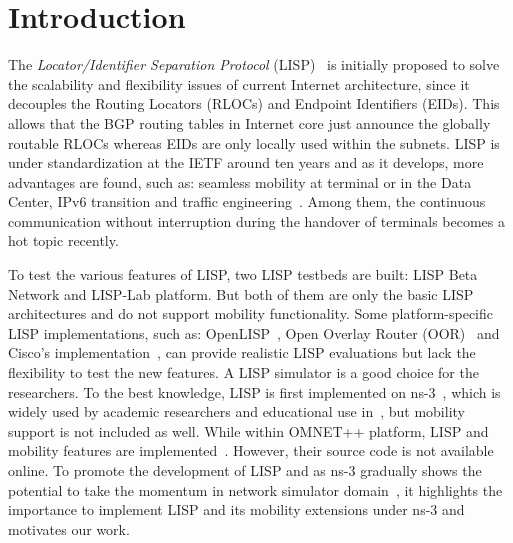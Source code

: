 \section{Introduction}
\label{sec:ns3_intro}
The \emph{Locator/Identifier Separation Protocol} (LISP)~\cite{rfc6830} is initially proposed to solve the scalability and flexibility issues of current Internet architecture, since it decouples the Routing Locators (RLOCs) and Endpoint Identifiers (EIDs). This allows that the BGP routing tables in Internet core just announce the globally routable RLOCs whereas EIDs are only locally used within the subnets. LISP is under standardization at the IETF around ten years and as it develops, more advantages are found, such as: seamless mobility at terminal or in the Data Center, IPv6 transition and traffic engineering~\cite{saucez2016locator}. Among them, the continuous communication without interruption during the handover of terminals becomes a hot topic recently.

To test the various features of LISP, two LISP testbeds are built: LISP Beta Network and LISP-Lab platform. But both of them are only the basic LISP architectures and do not support mobility functionality. Some platform-specific LISP implementations, such as: OpenLISP~\cite{phung2014openlisp}, Open Overlay Router (OOR)~\cite{LISPmob} and Cisco's implementation~\cite{CiscoIOS}, can provide realistic LISP evaluations but lack the flexibility to test the new features. A LISP simulator is a good choice for the researchers. To the best knowledge, LISP is first implemented on ns-3~\cite{ns3}, which is widely used by academic researchers and educational use in~\cite{lezama2009implementation}, but mobility support is not included as well. While within OMNET++ platform, LISP and mobility features are implemented~\cite{klein2012integration}. However, their source code is not available online. To promote the development of LISP and as ns-3 gradually shows the potential to take the momentum in network simulator domain~\cite{rana2017implementation}, it highlights the importance to implement LISP and its mobility extensions under ns-3 and motivates our work.

